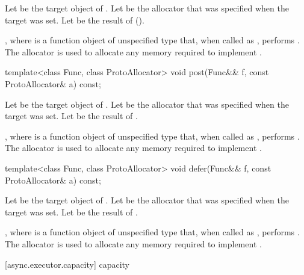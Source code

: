 \begin{itemdescr}
\pnum
Let  be the target object of . Let  be the allocator that was specified when the target was set. Let  be the result of  ().

\pnum
\effects {}, where  is a function object of unspecified type that, when called as , performs . The allocator  is used to allocate any memory required to implement .
\end{itemdescr}

%
\begin{itemdecl}
template<class Func, class ProtoAllocator>
  void post(Func&& f, const ProtoAllocator& a) const;
\end{itemdecl}

\begin{itemdescr}
\pnum
Let  be the target object of . Let  be the allocator that was specified when the target was set. Let  be the result of .

\pnum
\effects {}, where  is a function object of unspecified type that, when called as , performs . The allocator  is used to allocate any memory required to implement .
\end{itemdescr}

%
\begin{itemdecl}
template<class Func, class ProtoAllocator>
  void defer(Func&& f, const ProtoAllocator& a) const;
\end{itemdecl}

\begin{itemdescr}
\pnum
Let  be the target object of . Let  be the allocator that was specified when the target was set. Let  be the result of .

\pnum
\effects {}, where  is a function object of unspecified type that, when called as , performs . The allocator  is used to allocate any memory required to implement .
\end{itemdescr}



[async.executor.capacity]{ capacity}

